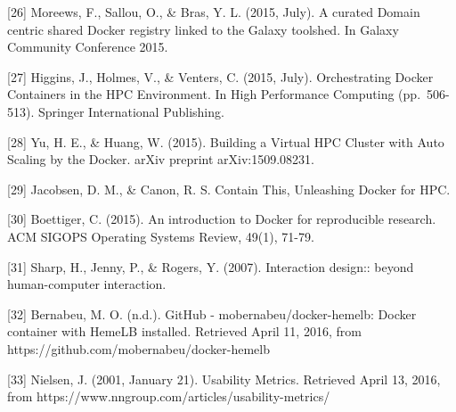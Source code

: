 \documentclass[]{article}
\begin{document}
{[}26{]} Moreews, F., Sallou, O., \& Bras, Y. L. (2015, July). A curated
Domain centric shared Docker registry linked to the Galaxy toolshed. In
Galaxy Community Conference 2015.

{[}27{]} Higgins, J., Holmes, V., \& Venters, C. (2015, July).
Orchestrating Docker Containers in the HPC Environment. In High
Performance Computing (pp.~506-513). Springer International Publishing.

{[}28{]} Yu, H. E., \& Huang, W. (2015). Building a Virtual HPC Cluster
with Auto Scaling by the Docker. arXiv preprint arXiv:1509.08231.

{[}29{]} Jacobsen, D. M., \& Canon, R. S. Contain This, Unleashing
Docker for HPC.

{[}30{]} Boettiger, C. (2015). An introduction to Docker for
reproducible research. ACM SIGOPS Operating Systems Review, 49(1),
71-79.

{[}31{]} Sharp, H., Jenny, P., \& Rogers, Y. (2007). Interaction
design:: beyond human-computer interaction.

{[}32{]} Bernabeu, M. O. (n.d.). GitHub - mobernabeu/docker-hemelb:
Docker container with HemeLB installed. Retrieved April 11, 2016, from
https://github.com/mobernabeu/docker-hemelb

{[}33{]} Nielsen, J. (2001, January 21). Usability Metrics. Retrieved
April 13, 2016, from https://www.nngroup.com/articles/usability-metrics/
\end{document}
